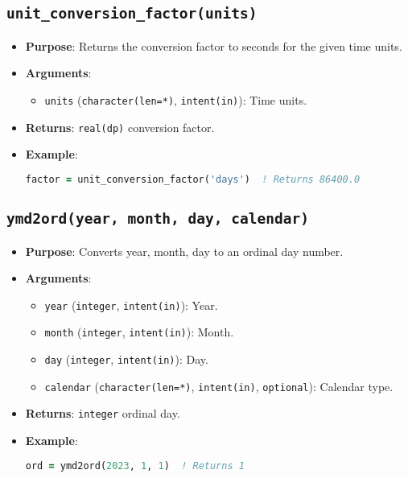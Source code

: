 \documentclass[12pt,a4paper]{report}
\begin{document}
\subsection{\texttt{unit\_conversion\_factor(units)}}
\begin{itemize}
\item \textbf{Purpose}: Returns the conversion factor to seconds for the given time units.
\item \textbf{Arguments}:
\begin{itemize}
\item \texttt{units} (\texttt{character(len=*)}, \texttt{intent(in)}): Time units.
\end{itemize}
\item \textbf{Returns}: \texttt{real(dp)} conversion factor.
\item \textbf{Example}:
\begin{lstlisting}[language=Fortran]
factor = unit_conversion_factor('days')  ! Returns 86400.0
\end{lstlisting}
\end{itemize}

\subsection{\texttt{ymd2ord(year, month, day, calendar)}}
\begin{itemize}
\item \textbf{Purpose}: Converts year, month, day to an ordinal day number.
\item \textbf{Arguments}:
\begin{itemize}
\item \texttt{year} (\texttt{integer}, \texttt{intent(in)}): Year.
\item \texttt{month} (\texttt{integer}, \texttt{intent(in)}): Month.
\item \texttt{day} (\texttt{integer}, \texttt{intent(in)}): Day.
\item \texttt{calendar} (\texttt{character(len=*)}, \texttt{intent(in)}, \texttt{optional}): Calendar type.
\end{itemize}
\item \textbf{Returns}: \texttt{integer} ordinal day.
\item \textbf{Example}:
\begin{lstlisting}[language=Fortran]
ord = ymd2ord(2023, 1, 1)  ! Returns 1
\end{lstlisting}
\end{itemize}
\end{document}
